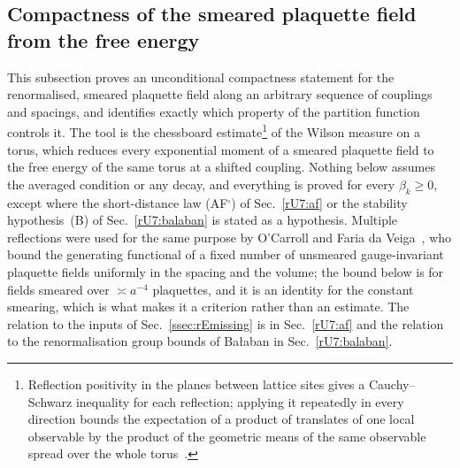 \subsection{Compactness of the smeared plaquette field from the free energy}
\label{rU7:sec}

This subsection proves an unconditional compactness statement for the
renormalised, smeared plaquette field along an arbitrary sequence of
couplings and spacings, and identifies exactly which property of the
partition function controls it. The tool is the chessboard estimate\footnote{Reflection positivity in the planes between lattice sites gives a Cauchy--Schwarz inequality for each reflection; applying it repeatedly in every direction bounds the expectation of a product of translates of one local observable by the product of the geometric means of the same observable spread over the whole torus~\cite{FILS78}.} of the
Wilson measure on a torus, which reduces every exponential moment of a
smeared plaquette field to the free energy of the same torus at a shifted
coupling. Nothing below assumes the averaged condition or any decay, and
everything is proved for every $\beta_k\ge0$, except where the
short-distance law (AF$^\square$) of Sec.~\ref{rU7:af} or the stability
hypothesis~(B) of Sec.~\ref{rU7:balaban} is stated as a hypothesis. Multiple reflections were used
for the same purpose by O'Carroll and Faria da Veiga~\cite{OCFdV20}, who bound
the generating functional of a fixed number of unsmeared gauge-invariant
plaquette fields uniformly in the spacing and the volume; the bound below is for fields smeared over
$\asymp a^{-4}$ plaquettes, and it is an identity for the constant smearing,
which is what makes it a criterion rather than an estimate. The relation to the inputs of
Sec.~\ref{ssec:rEmissing} is in Sec.~\ref{rU7:af} and the relation to the
renormalisation group bounds of Ba{\l}aban in Sec.~\ref{rU7:balaban}.

